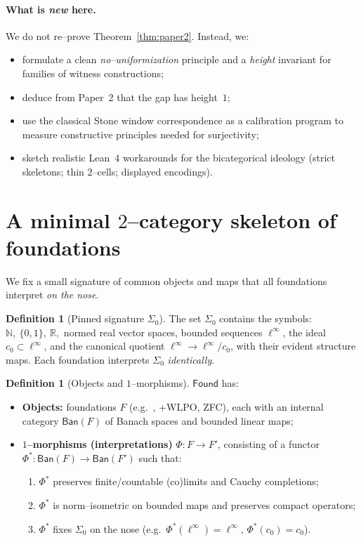 \documentclass[11pt]{article}
\theoremstyle{definition}
\newtheorem{definition}[theorem]{Definition}
\theoremstyle{remark}
\newcommand{\N}{\mathbb{N}}
\newcommand{\R}{\mathbb{R}}
\newcommand{\cnull}{c_0}
\newcommand{\linf}{\ell^\infty}
\newcommand{\WLPO}{\mathrm{WLPO}}
\newcommand{\BISH}{\mathrm{BISH}}
\newcommand{\Found}{\mathsf{Found}}
\newcommand{\Ban}{\mathsf{Ban}}
\newcommand{\SigmaZero}{\Sigma_{0}}
\begin{document}
\paragraph{What is \emph{new} here.}
We do not re--prove Theorem~\ref{thm:paper2}. Instead, we:
\begin{itemize}
\item formulate a clean \emph{no--uniformization} principle and a \emph{height} invariant for families of witness constructions;
\item deduce from Paper~2 that the gap has height~$1$;
\item use the classical Stone window correspondence as a calibration program to measure constructive principles needed for surjectivity;
\item sketch realistic Lean~4 workarounds for the bicategorical ideology (strict skeletons; thin $2$--cells; displayed encodings).
\end{itemize}

\section{A minimal $2$--category skeleton of foundations}\label{sec:found}

We fix a small signature of common objects and maps that all foundations interpret \emph{on the nose}.

\begin{definition}[Pinned signature \(\SigmaZero\)]
The set \(\SigmaZero\) contains the symbols: \(\N,\ \{0,1\},\ \R,\) normed real vector spaces, bounded sequences \(\linf\), the ideal \(\cnull\subset\linf\), and the canonical quotient \(\linf\to \linf/\cnull\), with their evident structure maps. Each foundation interprets \(\SigmaZero\) \emph{identically}.
\end{definition}

\begin{definition}[Objects and $1$--morphisms]
\(\Found\) has:
\begin{itemize}
\item \textbf{Objects:} foundations \(F\) (e.g.\ \BISH, \BISH+$\WLPO$, ZFC), each with an internal category \(\Ban(F)\) of Banach spaces and bounded linear maps;
\item \textbf{$1$--morphisms (interpretations)} \(\Phi:F\to F'\), consisting of a functor \(\Phi^*:\Ban(F)\to\Ban(F')\) such that:
  \begin{enumerate}
  \item \(\Phi^*\) preserves finite/countable (co)limits and Cauchy completions;
  \item $\Phi^*$ is norm--isometric on bounded maps and preserves compact operators;
  \item $\Phi^*$ fixes \(\SigmaZero\) on the nose (e.g.\ \(\Phi^*(\linf)=\linf\), \(\Phi^*(\cnull)=\cnull\)).
  \end{enumerate}
\end{itemize}
\end{definition}
\end{document}
